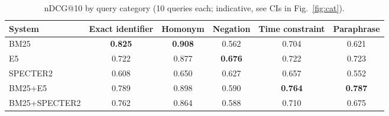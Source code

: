 \begin{table}[t]
\centering
\small
\caption{nDCG@10 by query category (10 queries each; indicative, see CIs in Fig.~\ref{fig:cat}).}
\label{tab:cat}
\begin{tabular}{lccccc}
\toprule
System & Exact identifier & Homonym & Negation & Time constraint & Paraphrase \\
\midrule
BM25 & \textbf{0.825} & \textbf{0.908} & 0.562 & 0.704 & 0.621 \\
E5 & 0.722 & 0.877 & \textbf{0.676} & 0.722 & 0.723 \\
SPECTER2 & 0.608 & 0.650 & 0.627 & 0.657 & 0.552 \\
BM25+E5 & 0.789 & 0.898 & 0.590 & \textbf{0.764} & \textbf{0.787} \\
BM25+SPECTER2 & 0.762 & 0.864 & 0.588 & 0.710 & 0.675 \\
\bottomrule
\end{tabular}
\end{table}
